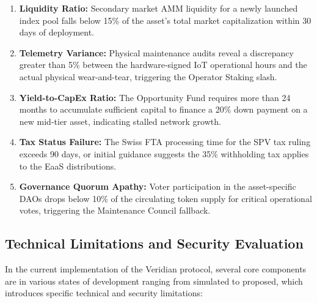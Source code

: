 \documentclass{Resources/bdlt-project}
\begin{document}
\begin{enumerate}
    \item \textbf{Liquidity Ratio:} Secondary market AMM liquidity for a newly launched index pool falls below 15\% of the asset's total market capitalization within 30 days of deployment.
    \item \textbf{Telemetry Variance:} Physical maintenance audits reveal a discrepancy greater than 5\% between the hardware-signed IoT operational hours and the actual physical wear-and-tear, triggering the Operator Staking slash.
    \item \textbf{Yield-to-CapEx Ratio:} The Opportunity Fund requires more than 24 months to accumulate sufficient capital to finance a 20\% down payment on a new mid-tier asset, indicating stalled network growth.
    \item \textbf{Tax Status Failure:} The Swiss FTA processing time for the SPV tax ruling exceeds 90 days, or initial guidance suggests the 35\% withholding tax applies to the EaaS distributions.
    \item \textbf{Governance Quorum Apathy:} Voter participation in the asset-specific DAOs drops below 10\% of the circulating token supply for critical operational votes, triggering the Maintenance Council fallback.
\end{enumerate}

\subsection{Technical Limitations and Security Evaluation}
In the current implementation of the Veridian protocol, several core components are in various states of development ranging from simulated to proposed, which introduces specific technical and security limitations:
\end{document}

